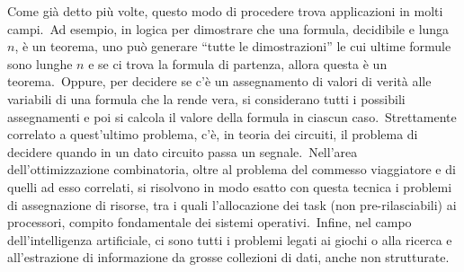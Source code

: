 \begin{example} 
    Come già detto più volte, questo modo di procedere trova applicazioni in molti campi.\
    Ad esempio, in logica per dimostrare che una formula, decidibile e lunga $n$, è un teorema, uno può generare ``tutte le dimostrazioni'' le cui ultime formule sono lunghe $n$ e se ci trova la formula di partenza, allora questa è un teorema.\
    Oppure, per decidere se c'è un assegnamento di valori di verità alle variabili di una formula che la rende vera, si considerano tutti i possibili assegnamenti e poi si calcola il valore della formula in ciascun caso.\
    Strettamente correlato a quest'ultimo problema, c'è, in teoria dei circuiti, il problema di decidere quando in un dato circuito passa un segnale.\
    Nell'area dell'ottimizzazione combinatoria, oltre al problema del commesso viaggiatore e di quelli ad esso correlati, si risolvono in modo esatto con questa tecnica i problemi di assegnazione di risorse, tra i quali l'allocazione dei task (non pre-rilasciabili) ai processori, compito fondamentale dei sistemi operativi.\
    Infine, nel campo dell'intelligenza artificiale, ci sono tutti i problemi legati ai giochi o alla ricerca e all'estrazione di informazione da grosse collezioni di dati, anche non strutturate.
\end{example}

